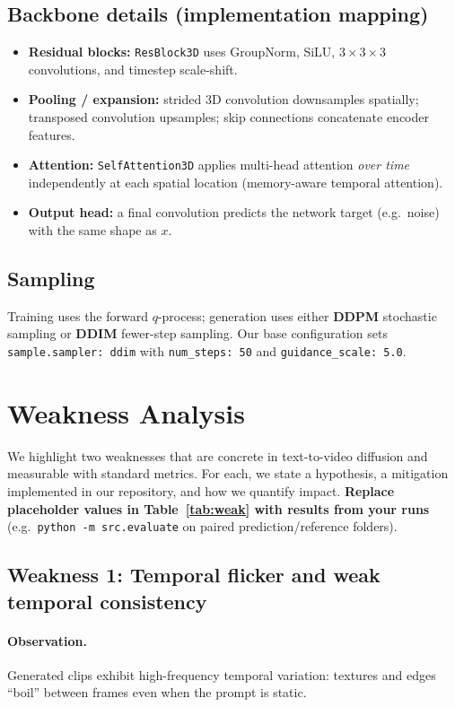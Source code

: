\documentclass[11pt,a4paper]{article}
\begin{document}
\subsection{Backbone details (implementation mapping)}
\begin{itemize}
  \item \textbf{Residual blocks:} \texttt{ResBlock3D} uses GroupNorm, SiLU, $3\times3\times3$ convolutions, and timestep scale-shift.
  \item \textbf{Pooling / expansion:} strided 3D convolution downsamples spatially; transposed convolution upsamples; skip connections concatenate encoder features.
  \item \textbf{Attention:} \texttt{SelfAttention3D} applies multi-head attention \emph{over time} independently at each spatial location (memory-aware temporal attention).
  \item \textbf{Output head:} a final convolution predicts the network target (e.g.\ noise) with the same shape as $x$.
\end{itemize}

\subsection{Sampling}
Training uses the forward $q$-process; generation uses either \textbf{DDPM} stochastic sampling or \textbf{DDIM} fewer-step sampling.
Our base configuration sets \texttt{sample.sampler: ddim} with \texttt{num\_steps: 50} and \texttt{guidance\_scale: 5.0}.

\section{Weakness Analysis}
\label{sec:weak}

We highlight two weaknesses that are concrete in text-to-video diffusion and measurable with standard metrics.
For each, we state a hypothesis, a mitigation implemented in our repository, and how we quantify impact.
\textbf{Replace placeholder values in Table~\ref{tab:weak} with results from your runs} (e.g.\ \texttt{python -m src.evaluate} on paired prediction/reference folders).

\subsection{Weakness 1: Temporal flicker and weak temporal consistency}
\paragraph{Observation.}
Generated clips exhibit high-frequency temporal variation: textures and edges ``boil'' between frames even when the prompt is static.
\end{document}
